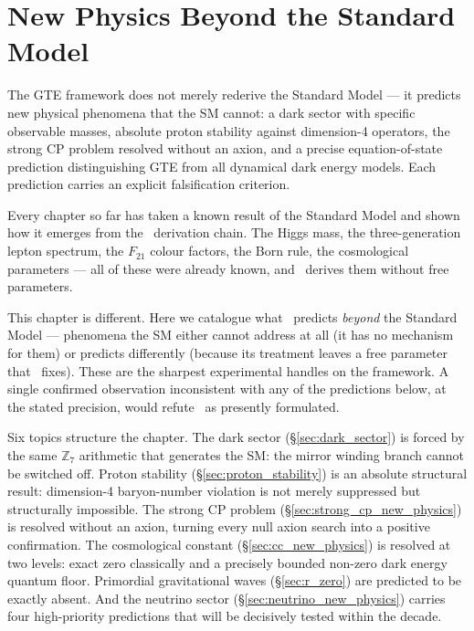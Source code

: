 \documentclass[11pt,openany]{book}
\theoremstyle{remark}
\newcommand{\GTE}{\text{GTE}}
\newcommand{\ZS}{\mathbb{Z}_7}
\begin{document}
\chapter{New Physics Beyond the Standard Model}
\label{chap:new_physics}

\begin{tcolorbox}[colback=blue!5,colframe=blue!50!black,title={Chapter~12 Claim}]
The GTE framework does not merely rederive the Standard Model --- it predicts new physical
phenomena that the SM cannot: a dark sector with specific observable masses, absolute proton
stability against dimension-4 operators, the strong CP problem resolved without an axion,
and a precise equation-of-state prediction distinguishing GTE from all dynamical dark energy
models. Each prediction carries an explicit falsification criterion.
\end{tcolorbox}

Every chapter so far has taken a known result of the Standard Model and shown how it
emerges from the \GTE\ derivation chain.  The Higgs mass, the three-generation lepton
spectrum, the $F_{21}$ colour factors, the Born rule, the cosmological parameters ---
all of these were already known, and \GTE\ derives them without free parameters.

This chapter is different.  Here we catalogue what \GTE\ predicts \emph{beyond} the
Standard Model --- phenomena the SM either cannot address at all (it has no mechanism
for them) or predicts differently (because its treatment leaves a free parameter that
\GTE\ fixes).  These are the sharpest experimental handles on the framework.  A single
confirmed observation inconsistent with any of the predictions below, at the stated
precision, would refute \GTE\ as presently formulated.

Six topics structure the chapter.  The dark sector (\S\ref{sec:dark_sector}) is forced
by the same $\ZS$ arithmetic that generates the SM: the mirror winding branch cannot be
switched off.  Proton stability (\S\ref{sec:proton_stability}) is an absolute structural
result: dimension-4 baryon-number violation is not merely suppressed but structurally
impossible.  The strong CP problem (\S\ref{sec:strong_cp_new_physics}) is resolved
without an axion, turning every null axion search into a positive confirmation.  The
cosmological constant (\S\ref{sec:cc_new_physics}) is resolved at two levels: exact
zero classically and a precisely bounded non-zero dark energy quantum floor.  Primordial
gravitational waves (\S\ref{sec:r_zero}) are predicted to be exactly absent.  And the
neutrino sector (\S\ref{sec:neutrino_new_physics}) carries four high-priority predictions
that will be decisively tested within the decade.
\end{document}
